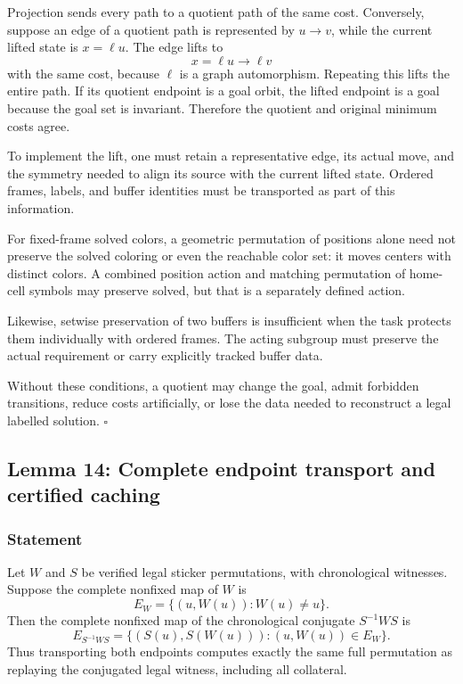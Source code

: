 \documentclass[
  10pt,
  a4paper,
]{article}
\begin{document}
Projection sends every path to a quotient path of the same cost.
Conversely, suppose an edge of a quotient path is represented by
\(u\to v\), while the current lifted state is \(x=\ell u\). The edge
lifts to \begin{equation}
x=\ell u\longrightarrow\ell v
\end{equation} with the same cost, because \(\ell\) is a graph
automorphism. Repeating this lifts the entire path. If its quotient
endpoint is a goal orbit, the lifted endpoint is a goal because the goal
set is invariant. Therefore the quotient and original minimum costs
agree.

To implement the lift, one must retain a representative edge, its actual
move, and the symmetry needed to align its source with the current
lifted state. Ordered frames, labels, and buffer identities must be
transported as part of this information.

For fixed-frame solved colors, a geometric permutation of positions
alone need not preserve the solved coloring or even the reachable color
set: it moves centers with distinct colors. A combined position action
and matching permutation of home-cell symbols may preserve solved, but
that is a separately defined action.

Likewise, setwise preservation of two buffers is insufficient when the
task protects them individually with ordered frames. The acting subgroup
must preserve the actual requirement or carry explicitly tracked buffer
data.

Without these conditions, a quotient may change the goal, admit
forbidden transitions, reduce costs artificially, or lose the data
needed to reconstruct a legal labelled solution. \(\square\)

\subsection{Lemma 14: Complete endpoint transport and certified
caching}\label{lemma-14-complete-endpoint-transport-and-certified-caching}

\subsubsection{Statement}\label{statement-13}

Let \(W\) and \(S\) be verified legal sticker permutations, with
chronological witnesses. Suppose the complete nonfixed map of \(W\) is
\begin{equation}
E_W=\{(u,W(u)):W(u)\ne u\}.
\end{equation} Then the complete nonfixed map of the chronological
conjugate \(S^{-1}WS\) is \begin{equation}
E_{S^{-1}WS}
=
\{(S(u),S(W(u))):(u,W(u))\in E_W\}.
\end{equation} Thus transporting both endpoints computes exactly the
same full permutation as replaying the conjugated legal witness,
including all collateral.
\end{document}
